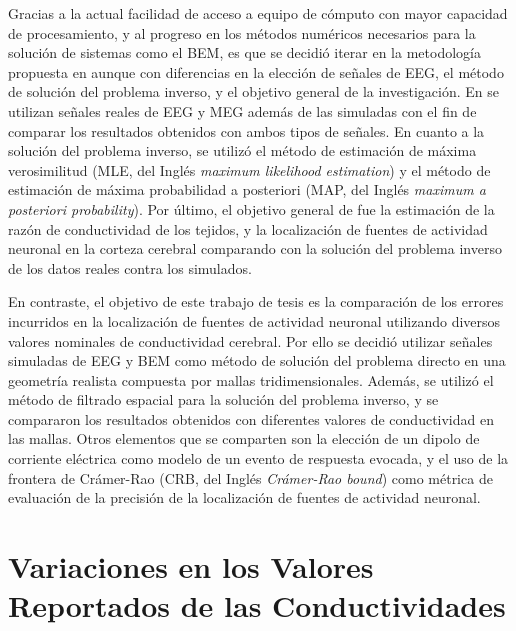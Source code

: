 Gracias a la actual facilidad de acceso a equipo de cómputo con mayor capacidad de procesamiento, y al progreso en los métodos numéricos necesarios para la solución de sistemas como el BEM, es que se decidió iterar en la metodología propuesta en \cite{Gutierrez2004} aunque con diferencias en la elección de señales de EEG, el método de solución del problema inverso, y el objetivo general de la investigación.
En \cite{Gutierrez2004} se utilizan señales reales de EEG y MEG además de las simuladas con el fin de comparar los resultados obtenidos con ambos tipos de señales.
En cuanto a la solución del problema inverso, se utilizó el método de estimación de máxima verosimilitud (MLE, del Inglés \emph{maximum likelihood estimation}) y el método de estimación de máxima probabilidad a posteriori (MAP, del Inglés \emph{maximum a posteriori probability}).
Por último, el objetivo general de \cite{Gutierrez2004} fue la estimación de la razón de conductividad de los tejidos, y la localización de fuentes de actividad neuronal en la corteza cerebral comparando con la solución del problema inverso de los datos reales contra los simulados.

En contraste, el objetivo de este trabajo de tesis es la comparación de los errores incurridos en la localización de fuentes de actividad neuronal utilizando diversos valores nominales de conductividad cerebral. 
Por ello se decidió utilizar señales simuladas de EEG y BEM como método de solución del problema directo en una geometría realista compuesta por mallas tridimensionales.
Además, se utilizó el método de filtrado espacial para la solución del problema inverso, y se compararon los resultados obtenidos con diferentes valores de conductividad en las mallas.
Otros elementos que se comparten \cite{Gutierrez2004} son la elección de un dipolo de corriente eléctrica como modelo de un evento de respuesta evocada, y el uso de la frontera de Crámer-Rao (CRB, del Inglés \emph{Crámer-Rao bound}) como métrica de evaluación de la precisión de la localización de fuentes de actividad neuronal.

\section{Variaciones en los Valores Reportados de las Conductividades}
\label{sec:related:mccann}

